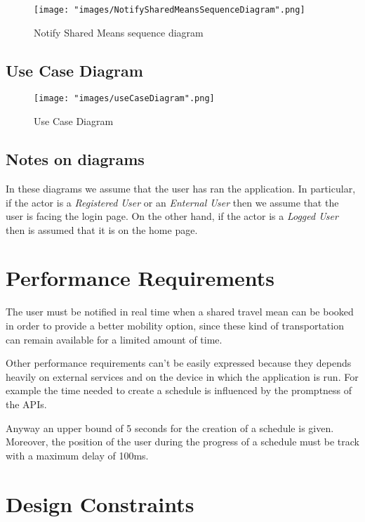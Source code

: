 \begin{figure}[H]
\begin{center}
\texttt{[image: "images/NotifySharedMeansSequenceDiagram".png]}
\caption{Notify Shared Means sequence diagram}
\end{center}
\end{figure}

\subsection{Use Case Diagram}

\begin{figure}[H]
\begin{center}
\texttt{[image: "images/useCaseDiagram".png]}
\caption{Use Case Diagram}
\label{img:seqDiagrPasswordRecovery}
\end{center}
\end{figure}

\subsection{Notes on diagrams}
In these diagrams we assume that the user has ran the application. In particular, if the actor is a \textit{Registered User} or an \textit{Enternal User} then we assume that the user is facing the login page. On the other hand, if the actor is a \textit{Logged User} then is assumed that it is on the home page.

\section{Performance Requirements} \label{\sec:performanceRequirements}
The user must be notified in real time when a shared travel mean can be booked in order to provide a better mobility option,
since these kind of transportation can remain available for a limited amount of time.

Other performance requirements can't be easily expressed because they depends heavily on external services and on the device in which the application is run. For example the time needed to create a schedule is influenced by the promptness of the APIs.

Anyway an upper bound of 5 seconds for the creation of a schedule is given. Moreover, the position of the user during the progress of a schedule must be track with a maximum delay of 100ms.

\section{Design Constraints}

